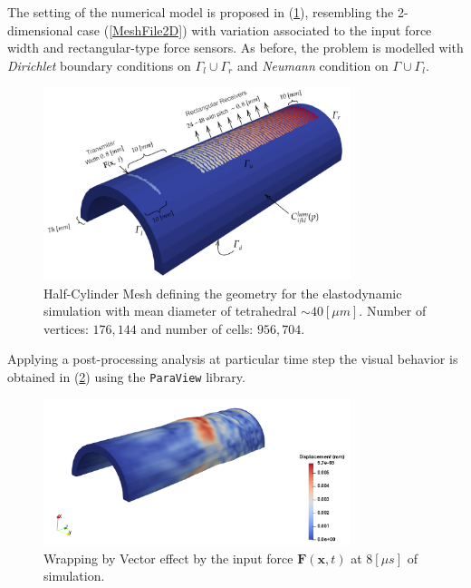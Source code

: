 The setting of the numerical model is proposed in (\ref{HalfCylSubdomainsFile}), resembling the 2-dimensional case (\ref{MeshFile2D}) with variation associated to the input force width and rectangular-type force sensors. As before, the problem is modelled with \textit{Dirichlet} boundary conditions on $\Gamma_l \cup \Gamma_r$ and \textit{Neumann} condition on $\Gamma \cup \Gamma_l$.

\begin{figure}[!h]
	\centering
	\includegraphics[width=0.8\textwidth]{images/ImgExt/HalfCyl3d-MeshBoundaries.png}
	\caption{Half-Cylinder Mesh defining the geometry for the elastodynamic simulation with mean diameter of tetrahedral $\sim 40 [\mu m]$. Number of vertices: $176,144$ and number of cells: $956,704$.}
	\label{HalfCylSubdomainsFile}
\end{figure} 

Applying a post-processing analysis at particular time step the visual behavior is obtained in (\ref{HalfCyl-TimeStep}) using the \texttt{ParaView} library.

\begin{figure}[!h]
	\centering
	\includegraphics[width=0.8\textwidth]{images/ImgExt/HalfCyl3d-T160.png}
	\caption{Wrapping by Vector effect by the input force $\mathbf{F}(\mathbf{x},t)$ at $8 [\mu s]$ of simulation.}
	\label{HalfCyl-TimeStep}
\end{figure} 

